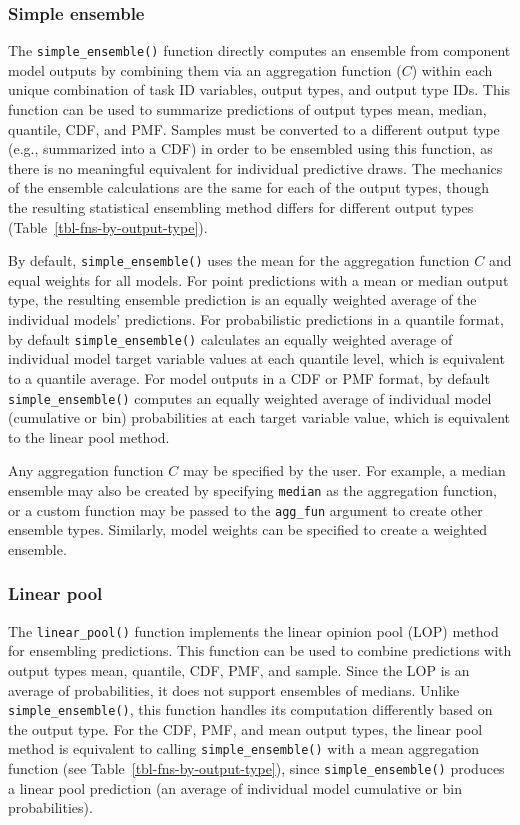 \documentclass[
]{article}
\begin{document}
\subsubsection{Simple ensemble}\label{sec-simple-ensemble}

The \texttt{simple\_ensemble()} function directly computes an ensemble
from component model outputs by combining them via an aggregation
function (\(C\)) within each unique combination of task ID variables,
output types, and output type IDs. This function can be used to
summarize predictions of output types mean, median, quantile, CDF, and
PMF. Samples must be converted to a different output type (e.g.,
summarized into a CDF) in order to be ensembled using this function, as
there is no meaningful equivalent for individual predictive draws. The
mechanics of the ensemble calculations are the same for each of the
output types, though the resulting statistical ensembling method differs
for different output types (Table~\ref{tbl-fns-by-output-type}).

By default, \texttt{simple\_ensemble()} uses the mean for the
aggregation function \(C\) and equal weights for all models. For point
predictions with a mean or median output type, the resulting ensemble
prediction is an equally weighted average of the individual models'
predictions. For probabilistic predictions in a quantile format, by
default \texttt{simple\_ensemble()} calculates an equally weighted
average of individual model target variable values at each quantile
level, which is equivalent to a quantile average. For model outputs in a
CDF or PMF format, by default \texttt{simple\_ensemble()} computes an
equally weighted average of individual model (cumulative or bin)
probabilities at each target variable value, which is equivalent to the
linear pool method.

Any aggregation function \(C\) may be specified by the user. For
example, a median ensemble may also be created by specifying
\texttt{median} as the aggregation function, or a custom function may be
passed to the \texttt{agg\_fun} argument to create other ensemble types.
Similarly, model weights can be specified to create a weighted ensemble.

\subsubsection{Linear pool}\label{sec-linear-pool}

The \texttt{linear\_pool()} function implements the linear opinion pool
(LOP) method for ensembling predictions. This function can be used to
combine predictions with output types mean, quantile, CDF, PMF, and
sample. Since the LOP is an average of probabilities, it does not
support ensembles of medians. Unlike \texttt{simple\_ensemble()}, this
function handles its computation differently based on the output type.
For the CDF, PMF, and mean output types, the linear pool method is
equivalent to calling \texttt{simple\_ensemble()} with a mean
aggregation function (see Table~\ref{tbl-fns-by-output-type}), since
\texttt{simple\_ensemble()} produces a linear pool prediction (an
average of individual model cumulative or bin probabilities).
\end{document}
